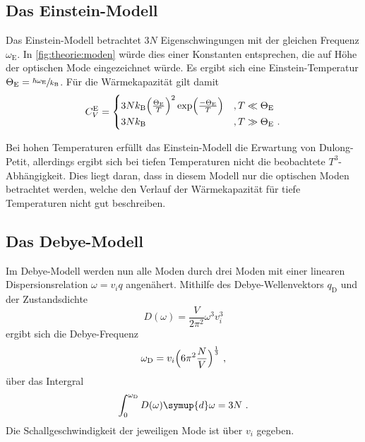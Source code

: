\subsection{Das Einstein-Modell}
\label{sec:theorie:einstein}

    Das Einstein-Modell betrachtet $3N$ Eigenschwingungen mit der gleichen Frequenz $\omega_\text{E}$.
    In \autoref{fig:theorie:moden} würde dies einer Konstanten entsprechen,
    die auf Höhe der optischen Mode eingezeichnet würde.
    Es ergibt sich eine Einstein-Temperatur $\Theta_\text{E} = \sfrac{\hbar \omega_\text{E}}{k_\text{B}}$.
    Für die Wärmekapazität gilt damit
    \begin{equation*}
        C^{\text{E}}_V =
        \begin{cases}
            3Nk_\text{B} \Bigl(\frac{\Theta_\text{E}}{T}\Bigr)^2 \exp\Bigl(\frac{-\Theta_\text{E}}{T}\Bigr) & , T \ll \Theta_\text{E} \\
            3Nk_\text{B} & , T \gg \Theta_\text{E} \ .
        \end{cases}
    \end{equation*}

    Bei hohen Temperaturen erfüllt das Einstein-Modell die Erwartung von Dulong-Petit,
    allerdings ergibt sich bei tiefen Temperaturen nicht die beobachtete $T^3$-Abhängigkeit.
    Dies liegt daran,
    dass in diesem Modell nur die optischen Moden betrachtet werden,
    welche den Verlauf der Wärmekapazität für tiefe Temperaturen nicht gut beschreiben.

\subsection{Das Debye-Modell}
\label{sec:theorie:debye}

    Im Debye-Modell werden nun alle Moden durch drei Moden mit einer linearen Dispersionsrelation $\omega = v_i q$ angenähert.
    Mithilfe des Debye-Wellenvektors $q_\text{D}$ und der Zustandsdichte
    \begin{equation*}
        D(\omega) = \frac{V}{2 \pi^2}{\omega^3}{v^3_i}
    \end{equation*}
    ergibt sich die Debye-Frequenz
    \begin{equation*}
        \omega_\text{D} = v_i \Bigl(6 \pi^2 \frac{N}{V}\Bigr)^{\frac{1}{3}} \ ,
    \end{equation*}
    über das Intergral
    \begin{equation*}
        \int_0^{\omega_\text{D}} D(\omega) \symup{d}\omega = 3N \ .
    \end{equation*}
    Die Schallgeschwindigkeit der jeweiligen Mode ist über $v_i$ gegeben.

